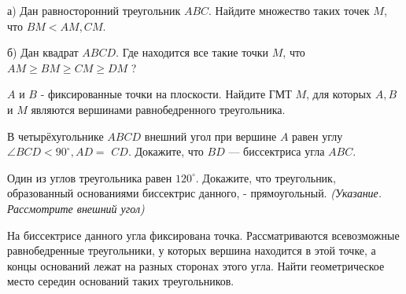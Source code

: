 а) Дан равносторонний треугольник $A B C$. Найдите множество таких точек $M$, что $B M<A M, C M$.

\noindent
б) Дан квадрат $A B C D$. Где находится все такие точки $M$, что $A M \geqslant B M \geqslant C M \geqslant D M$ ?


$A$ и $B$ - фиксированные точки на плоскости. Найдите ГМТ $M$, для которых $A, B$ и $M$ являются вершинами равнобедренного треугольника.

В четырёхугольнике $A B C D$ внешний угол при вершине $A$ равен углу $\angle B C D<90^{\circ}, A D=$ $C D$. Докажите, что $B D$ --- биссектриса угла $A B C$.

Один из углов треугольника равен $120^{\circ}$. Докажите, что треугольник, образованный основаниями биссектрис данного, - прямоугольный. \textit{(Указание. Рассмотрите внешний угол)}

На биссектрисе данного угла фиксирована точка. Рассматриваются всевозможные равнобедренные треугольники, у которых вершина находится в этой точке, а концы оснований лежат на разных сторонах этого угла. Найти геометрическое место середин оснований таких треугольников.